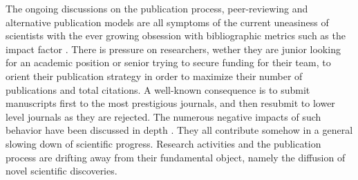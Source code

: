 \documentclass[letterpaper,twocolumn,superscriptaddress,showkeys,longbibliography]{revtex4-1}
\begin{document}
The ongoing discussions on the publication process, peer-reviewing and alternative publication models are all symptoms of the current uneasiness of scientists with the ever growing obsession with bibliographic metrics such as the impact factor \cite{Fisher2012}. There is pressure on researchers, wether they are junior looking for an academic position or senior trying to secure funding for their team, to orient their publication strategy in order to maximize their number of publications and total citations. A well-known consequence is to submit manuscripts first to the most prestigious journals, and then resubmit to lower level journals as they are rejected. The numerous negative impacts of such behavior have been discussed in depth \cite{hoc09}. They all contribute somehow in a general slowing down of scientific progress. Research activities and the publication process are drifting away from their fundamental object, namely the diffusion of novel scientific discoveries. 
\end{document}

